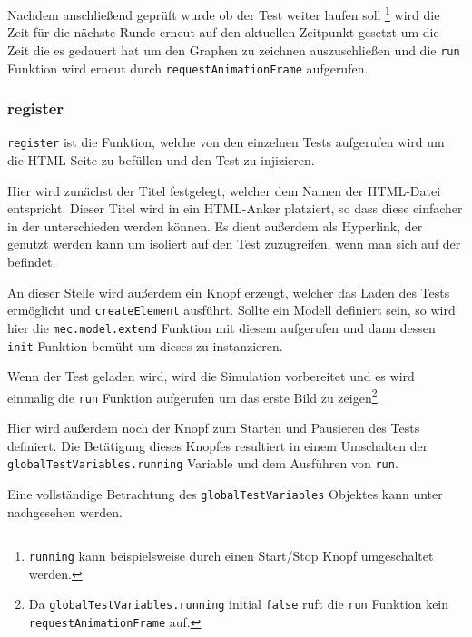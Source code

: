 Nachdem anschließend geprüft wurde ob der Test weiter laufen soll \footnote{\lstinline{running} kann beispielsweise durch einen Start/Stop Knopf umgeschaltet werden.} wird die Zeit für die nächste Runde erneut auf den aktuellen Zeitpunkt gesetzt um die Zeit die es gedauert hat um den Graphen zu zeichnen auszuschließen und die \lstinline{run} Funktion wird erneut durch \lstinline{requestAnimationFrame} aufgerufen.

\subsubsection{register}

\lstinline{register} ist die Funktion, welche von den einzelnen Tests aufgerufen wird um die HTML-Seite zu befüllen und den Test zu injizieren.

Hier wird zunächst der Titel festgelegt, welcher dem Namen der HTML-Datei entspricht.
Dieser Titel wird in ein HTML-Anker %
platziert, so dass diese einfacher in der  unterschieden werden können.
Es dient außerdem als Hyperlink, der genutzt werden kann um isoliert auf den Test zuzugreifen, wenn man sich auf der  befindet.

An dieser Stelle wird außerdem ein Knopf erzeugt, welcher das Laden des Tests ermöglicht und \lstinline{createElement} ausführt.
Sollte ein  Modell definiert sein, so wird hier die \lstinline{mec.model.extend} Funktion mit diesem aufgerufen und dann dessen \lstinline{init} Funktion bemüht um dieses zu instanzieren. %

Wenn der Test geladen wird, wird die Simulation vorbereitet und es wird einmalig die \lstinline{run} Funktion aufgerufen um das erste Bild zu zeigen\footnote{Da \lstinline{globalTestVariables.running} initial \lstinline{false} ruft die \lstinline{run} Funktion kein \lstinline{requestAnimationFrame} auf.}.

Hier wird außerdem noch der Knopf zum Starten und Pausieren des Tests definiert.
Die Betätigung dieses Knopfes resultiert in einem Umschalten der \lstinline{globalTestVariables.running} Variable und dem Ausführen von \lstinline{run}.

Eine vollständige Betrachtung des \lstinline{globalTestVariables} Objektes kann unter %
nachgesehen werden.



